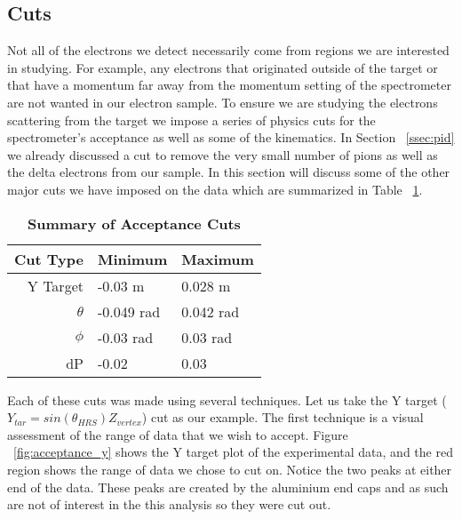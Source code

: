 
\subsection{Cuts}
\label{ssec:cuts}

Not all of the electrons we detect necessarily come from regions we are interested in studying. For example, any electrons that originated outside of the target or that have a momentum far away from the momentum setting of the spectrometer are not wanted in our electron sample. To ensure we are studying the electrons scattering from the target we impose a series of physics cuts for the spectrometer's acceptance as well as some of the kinematics. In Section ~\ref{ssec:pid} we already discussed a cut to remove the very small number of pions as well as the delta electrons from our sample. In this section will discuss some of the other major cuts we have imposed on the data which are summarized in Table ~\ref{tab:cuts}. 

\begin{table}[!h]
\centering
\begin{tabular}{|r | l l|}
\hline
\textbf{Cut Type} & \textbf{Minimum} & \textbf{Maximum}\\
\hline
Y Target & -0.03 m & 0.028 m\\ 
$\theta$ & -0.049 rad & 0.042 rad\\ 
$\phi$ & -0.03 rad & 0.03 rad\\ 
dP & -0.02 & 0.03\\ 
\hline
\end{tabular}
\caption{{\bf{Summary of Acceptance Cuts}} }
\label{tab:cuts}
\end{table}

Each of these cuts was made using several techniques. Let us take the Y target ($Y_{tar}=sin\left(\theta_{HRS}\right)Z_{vertex}$) cut as our example. The first technique is a visual assessment of the range of data that we wish to accept. Figure ~\ref{fig:acceptance_y} shows the Y target plot of the experimental data, and the red region shows the range of data we chose to cut on. Notice the two peaks at either end of the data. These peaks are created by the aluminium end caps and as such are not of interest in the this analysis so they were cut out. 

